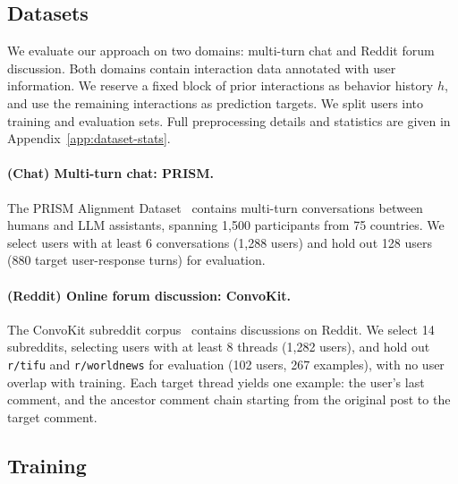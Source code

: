 \documentclass[11pt]{article}
\begin{document}
\subsection{Datasets}
We evaluate our approach on two domains: multi-turn chat and Reddit forum discussion. Both domains contain interaction data annotated with user information. We reserve a fixed block of prior interactions as behavior history $h$, and use the remaining interactions as prediction targets. We split users into training and evaluation sets. Full preprocessing details and statistics are given in Appendix~\ref{app:dataset-stats}.


\paragraph{(Chat) Multi-turn chat: PRISM.}
The PRISM Alignment Dataset~\citep{kirk2024prism} contains multi-turn conversations between humans and LLM assistants, spanning 1,500 participants from 75 countries. We select users with at least 6 conversations (1,288 users) and hold out 128 users (880 target user-response turns) for evaluation. 

\paragraph{(Reddit) Online forum discussion: ConvoKit.}
The ConvoKit subreddit corpus~\citep{chang2020convokit} contains discussions on Reddit. We select 14 subreddits, selecting users with at least 8 threads (1,282 users), and hold out \texttt{r/tifu} and \texttt{r/worldnews} for evaluation (102 users, 267 examples), with no user overlap with training. Each target thread yields one example: the user's last comment, and the ancestor comment chain starting from the original post to the target comment.

\subsection{Training}
\end{document}
